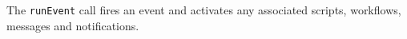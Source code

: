 The \verb+runEvent+ call fires an event and activates any associated scripts, workflows, messages and notifications.
